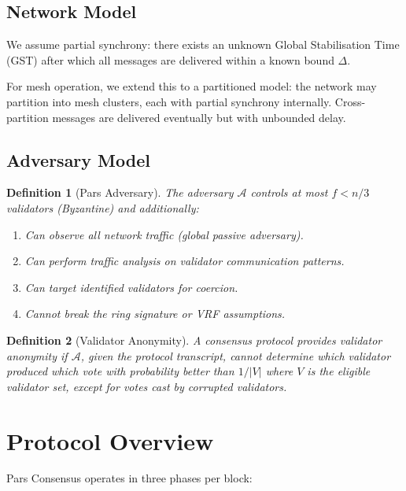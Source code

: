 \documentclass[11pt,a4paper]{article}
\newtheorem{definition}{Definition}[section]
\begin{document}
\subsection{Network Model}

We assume partial synchrony: there exists an unknown Global
Stabilisation Time (GST) after which all messages are delivered within
a known bound $\Delta$.

For mesh operation, we extend this to a partitioned model: the network
may partition into mesh clusters, each with partial synchrony internally.
Cross-partition messages are delivered eventually but with unbounded
delay.

\subsection{Adversary Model}

\begin{definition}[Pars Adversary]
    The adversary $\mathcal{A}$ controls at most $f < n/3$ validators
    (Byzantine) and additionally:
    \begin{enumerate}[label=(\alph*)]
        \item Can observe all network traffic (global passive adversary).
        \item Can perform traffic analysis on validator communication
        patterns.
        \item Can target identified validators for coercion.
        \item Cannot break the ring signature or VRF assumptions.
    \end{enumerate}
\end{definition}

\begin{definition}[Validator Anonymity]
    A consensus protocol provides validator anonymity if $\mathcal{A}$,
    given the protocol transcript, cannot determine which validator
    produced which vote with probability better than $1/|V|$ where $V$
    is the eligible validator set, except for votes cast by corrupted
    validators.
\end{definition}

\section{Protocol Overview}
\label{sec:protocol}

Pars Consensus operates in three phases per block:
\end{document}
